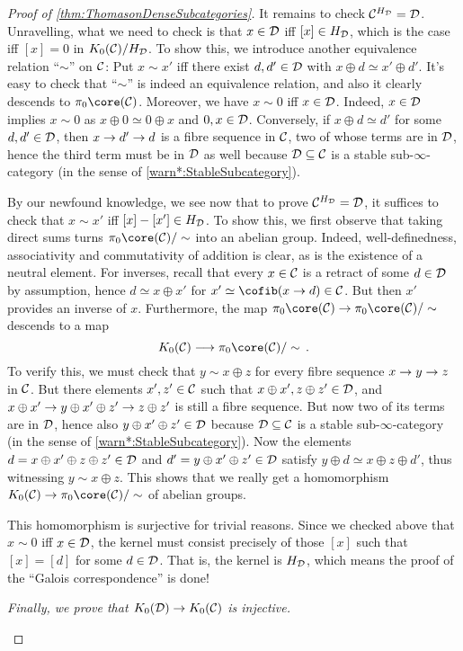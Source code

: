 \documentclass[a4paper, 10pt, oneside, DIV=9, chapterprefix=true, numbers=enddot,bibliography=totoc]{scrbook}
\begin{document}
\begin{proof}[Proof of \cref{thm:ThomasonDenseSubcategories}]
	It remains to check $\mathcal{C}^{H_{\mathcal{D}}}=\mathcal{D}$. Unravelling, what we need to check is that $x\in \mathcal{D}$ iff $[x]\in H_{\mathcal{D}}$, which is the case iff $[x]=0$ in $K_0(\mathcal{C})/H_{\mathcal{D}}$. To show this, we introduce another equivalence relation \enquote{$\sim$} on $\mathcal{C}$: Put $x\sim x'$ iff there exist $d,d'\in\mathcal{D}$ with $x\oplus d\simeq x'\oplus d'$. It's easy to check that \enquote{$\sim$} is indeed an equivalence relation, and also it clearly descends to $\pi_0\core(\Cc)$. Moreover, we have $x\sim 0$ iff $x\in\mathcal{D}$. Indeed, $x\in\mathcal{D}$ implies $x\sim 0$ as $x\oplus 0\simeq 0\oplus x$ and $0,x\in\mathcal{D}$. Conversely, if $x\oplus d\simeq d'$ for some $d,d'\in \mathcal{D}$, then $x\morphism d'\morphism d$ is a fibre sequence in $\mathcal{C}$, two of whose terms are in $\mathcal{D}$, hence the third term must be in $\mathcal{D}$ as well because $\mathcal{D}\subseteq \mathcal{C}$ is a stable sub-$\infty$-category (in the sense of \cref{warn*:StableSubcategory}).
	
	By our newfound knowledge, we see now that to prove $\mathcal{C}^{H_{\mathcal{D}}}=\mathcal{D}$, it suffices to check that $x\sim x'$ iff $[x]-[x']\in H_{\mathcal{D}}$. To show this, we first observe that taking direct sums turns $\pi_0\core(\Cc)/\sim$ into an abelian group. Indeed, well-definedness, associativity and commutativity of addition is clear, as is the existence of  a neutral element. For inverses, recall that every $x\in \mathcal{C}$ is a retract of some $d\in\mathcal{D}$ by assumption, hence $d\simeq x\oplus x'$ for $x'\simeq \cofib(x\morphism d)\in \Cc$. But then $x'$ provides an inverse of $x$. Furthermore, the map $\pi_0\core(\Cc)\morphism \pi_0\core(\Cc)/\sim$ descends to a map
	\begin{equation*}
		K_0(\Cc)\morphism \pi_0\core(\Cc)/\sim\,.
	\end{equation*}
	To verify this, we must check that $y\sim x\oplus z$ for every fibre sequence $x\morphism y\morphism z$ in $\mathcal{C}$. But there elements $x',z'\in \mathcal{C}$ such that $x\oplus x',z\oplus z'\in \mathcal{D}$, and $x\oplus x'\morphism y\oplus x'\oplus z'\morphism z\oplus z'$ is still a fibre sequence. But now two of its terms are in $\mathcal{D}$, hence also $y\oplus x'\oplus z'\in \mathcal{D}$ because $\mathcal{D}\subseteq \mathcal{C}$ is a stable sub-$\infty$-category (in the sense of \cref{warn*:StableSubcategory}). Now the elements $d=x\oplus x'\oplus z\oplus z'\in \mathcal{D}$ and $d'=y\oplus x'\oplus z'\in \mathcal{D}$ satisfy $y\oplus d\simeq x\oplus z\oplus d'$, thus witnessing $y\sim x\oplus z$. This shows that we really get a homomorphism $K_0(\Cc)\morphism \pi_0\core(\Cc)/\sim$ of abelian groups.
	
	This homomorphism is surjective for trivial reasons. Since we checked above that $x\sim 0$ iff $x\in \mathcal{D}$, the kernel must consist precisely of those $[x]$ such that $[x]=[d]$ for some $d\in \mathcal{D}$. That is, the kernel is $H_{\mathcal{D}}$, which means the proof of the \enquote{Galois correspondence} is done!
	\begin{alphanumerate}
		\item[\itememph{2}] \itshape Finally, we prove that $K_0(\Dd)\morphism K_0(\Cc)$ is injective.
	\end{alphanumerate}
	

\end{proof}
\end{document}
